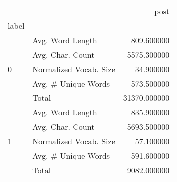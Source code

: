 \begin{tabular}{llr}
\toprule
 &  & post \\
label &  &  \\
\midrule
\multirow[t]{5}{*}{0} & Avg. Word Length & 809.600000 \\
 & Avg. Char. Count & 5575.300000 \\
 & Normalized Vocab. Size & 34.900000 \\
 & Avg. # Unique Words & 573.500000 \\
 & Total & 31370.000000 \\
\cline{1-3}
\multirow[t]{5}{*}{1} & Avg. Word Length & 835.900000 \\
 & Avg. Char. Count & 5693.500000 \\
 & Normalized Vocab. Size & 57.100000 \\
 & Avg. # Unique Words & 591.600000 \\
 & Total & 9082.000000 \\
\cline{1-3}
\bottomrule
\end{tabular}
